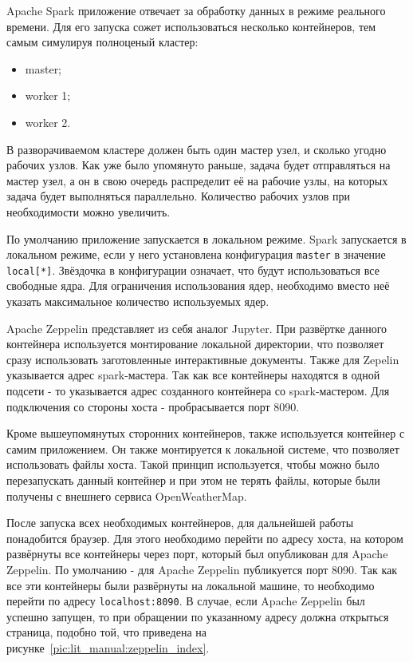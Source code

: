 Apache Spark приложение отвечает за обработку данных в режиме реального времени.
Для его запуска сожет использоваться несколько контейнеров, тем самым симулируя полноценый кластер:
\begin{itemize}
    \item master;
    \item worker 1;
    \item worker 2.
\end{itemize}

В разворачиваемом кластере должен быть один мастер узел, и сколько угодно рабочих узлов.
Как уже было упомянуто раньше, задача будет отправляться на мастер узел, а он в свою очередь распределит её на рабочие узлы, на которых задача будет выполняться параллельно.
Количество рабочих узлов при необходимости можно увеличить.

По умолчанию приложение запускается в локальном режиме.
Spark запускается в локальном режиме, если у него установлена конфигурация \texttt{master} в значение \texttt{local[*]}.
Звёздочка в конфигурации означает, что будут использоваться все свободные ядра.
Для ограничения использования ядер, необходимо вместо неё указать максимальное количество используемых ядер.

Apache Zeppelin представляет из себя аналог Jupyter.
При развёртке данного контейнера используется монтирование локальной директории, что позволяет сразу использовать заготовленные интерактивные документы.
Также для Zepelin указывается адрес spark-мастера.
Так как все контейнеры находятся в одной подсети - то указывается адрес созданного контейнера со spark-мастером.
Для подключения со стороны хоста - пробрасывается порт 8090.

Кроме вышеупомянутых сторонних контейнеров, также используется контейнер с самим приложением.
Он также монтируется к локальной системе, что позволяет использовать файлы хоста.
Такой принцип используется, чтобы можно было перезапускать данный контейнер и при этом не терять файлы, которые были получены с внешнего сервиса OpenWeatherMap.

После запуска всех необходимых контейнеров, для дальнейшей работы понадобится браузер.
Для этого необходимо перейти по адресу хоста, на котором развёрнуты все контейнеры через порт, который был опубликован для Apache Zeppelin.
По умолчанию - для Apache Zeppelin публикуется порт 8090.
Так как все эти контейнеры были развёрнуты на локальной машине, то необходимо перейти по адресу \texttt{localhost:8090}.
В случае, если Apache Zeppelin был успешно запущен, то при обращении по указанному адресу должна открыться страница, подобно той, что приведена на рисунке~\ref{pic:lit_manual:zeppelin_index}.


